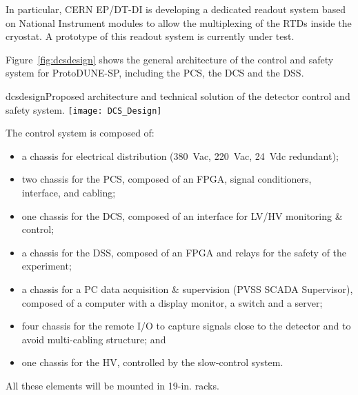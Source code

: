 In particular, CERN EP/DT-DI is developing a dedicated readout system based on National Instrument modules to allow the 
multiplexing of the RTDs inside the cryostat.  A prototype of this readout system is currently under test.
 
Figure~\ref{fig:dcsdesign} shows the general architecture of the control and safety system for ProtoDUNE-SP, including the PCS, the DCS and the DSS.

\begin{cdrfigure}{dcsdesign}{Proposed architecture and technical solution of the detector control and safety system.}
\texttt{[image: DCS\_Design]}
\end{cdrfigure}

The control system is composed of:
\begin{itemize}
\item a chassis for electrical distribution (380~Vac, 220~Vac, 24~Vdc redundant);
\item two chassis for the PCS, composed of an FPGA, signal conditioners, interface, and cabling;
\item one chassis for the DCS,  composed of an interface for LV/HV monitoring \& control; 
\item a chassis for the DSS, composed of an FPGA and relays for the safety of the experiment; 
\item a chassis for a PC data acquisition \& supervision (PVSS SCADA Supervisor), composed of a computer with a display monitor, a switch and a server; 
\item four chassis for the remote I/O to capture signals close to the detector and to avoid multi-cabling structure; and
\item one chassis for the HV, controlled by the slow-control system. 
\end{itemize}
All these elements will be mounted in 19-in. racks.



